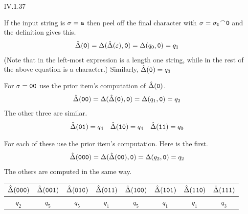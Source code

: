 \begin{ans}{IV.1.37}
  \begin{exparts}
  \item If the input string is $\sigma=\texttt{a}$ then peel off the final
    character with
    $\sigma=\sigma_0\concat\str{0}$ and the definition gives this.
    \begin{equation*}
      \hat{\Delta}(\texttt{0})
      =\Delta(\hat{\Delta}(\varepsilon),\texttt{0})
      =\Delta(q_0,\texttt{0})
      =q_1
    \end{equation*}
    (Note that in the left-most expression  is a length one string,
    while in the rest of the above equation  is a character.)
    Similarly, $\hat{\Delta}(\texttt{0})=q_3$
  \item For $\sigma=\texttt{00}$ use the prior item's computation of
    $\hat{\Delta}(\texttt{0})$.
    \begin{equation*}
      \hat{\Delta}(\texttt{00})
      =\Delta(\hat{\Delta}(\texttt{0}),\texttt{0})
      =\Delta(q_1,\texttt{0})
      =q_2
    \end{equation*}
    The other three are similar.
    \begin{equation*}
      \hat{\Delta}(\texttt{01})=q_4
      \quad\hat{\Delta}(\texttt{10})=q_4
      \quad\hat{\Delta}(\texttt{11})=q_0
    \end{equation*}
  \item
    For each of these use the prior item's computation.
    Here is the first.
    \begin{equation*}
      \hat{\Delta}(\texttt{000})
      =\Delta(\hat{\Delta}(\texttt{00}),\texttt{0})
      =\Delta(q_2,\texttt{0})
      =q_2
    \end{equation*}
    The others are computed in the same way.
    \begin{center}
    \begin{tabular}{*{8}{c}}
      $\hat{\Delta}(\texttt{000})$
      &$\hat{\Delta}(\texttt{001})$
      &$\hat{\Delta}(\texttt{010})$
      &$\hat{\Delta}(\texttt{011})$
      &$\hat{\Delta}(\texttt{100})$
      &$\hat{\Delta}(\texttt{101})$
      &$\hat{\Delta}(\texttt{110})$
      &$\hat{\Delta}(\texttt{111})$  \\ \hline
      $q_2$
      &$q_5$
      &$q_5$
      &$q_1$
      &$q_5$
      &$q_1$
      &$q_1$
      &$q_3$
    \end{tabular}
    \end{center}
  \end{exparts}
  
\end{ans}
